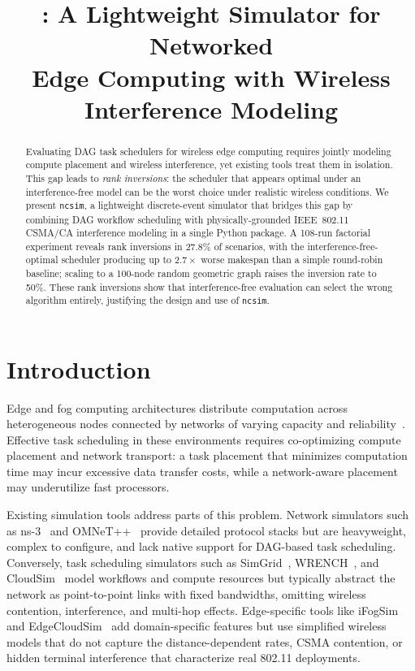 \documentclass[conference]{IEEEtran}
\title{\ncsim{}: A Lightweight Simulator for Networked\\Edge Computing with Wireless Interference Modeling}
\author{
\IEEEauthorblockN{Anonymous Author(s)}
\IEEEauthorblockA{Affiliation withheld for double-blind review}
}
\newcommand{\ncsim}{\texttt{ncsim}}
\begin{document}
\maketitle

\begin{abstract}
Evaluating DAG task schedulers for wireless edge computing requires
jointly modeling compute placement and wireless interference, yet
existing tools treat them in isolation.  This gap leads to
\emph{rank inversions}: the scheduler that appears optimal under an
interference-free model can be the worst choice under realistic
wireless conditions.  We present \ncsim{}, a lightweight
discrete-event simulator that bridges this gap by combining DAG
workflow scheduling with physically-grounded IEEE~802.11 CSMA/CA
interference modeling in a single Python package.  A 108-run
factorial experiment reveals rank inversions in 27.8\% of scenarios,
with the interference-free-optimal scheduler producing up to
$2.7\times$ worse makespan than a simple round-robin baseline;
scaling to a 100-node random geometric graph raises the inversion
rate to 50\%.  These rank inversions show that
interference-free evaluation can select the wrong algorithm
entirely, justifying the design and use of \ncsim{}.
\end{abstract}

\section{Introduction}
\label{sec:intro}

Edge and fog computing architectures distribute computation across
heterogeneous nodes connected by networks of varying capacity and
reliability~\cite{shi2016edge}.  Effective task scheduling in these
environments requires co-optimizing compute placement and network transport:
a task placement that minimizes computation time may incur excessive data
transfer costs, while a network-aware placement may underutilize fast
processors.

Existing simulation tools address parts of this problem.  Network simulators
such as ns-3~\cite{ns3} and OMNeT++~\cite{omnetpp} provide detailed protocol
stacks but are heavyweight, complex to configure, and lack native support for
DAG-based task scheduling.  Conversely, task scheduling simulators such as
SimGrid~\cite{simgrid}, WRENCH~\cite{wrench}, and CloudSim~\cite{cloudsim}
model workflows and compute resources but typically abstract the network as
point-to-point links with fixed bandwidths, omitting wireless contention,
interference, and multi-hop effects.  Edge-specific tools like
iFogSim~\cite{ifogsim} and EdgeCloudSim~\cite{edgecloudsim} add
domain-specific features but use simplified wireless models that do not
capture the distance-dependent rates, CSMA contention, or hidden terminal
interference that characterize real 802.11 deployments.
\end{document}
